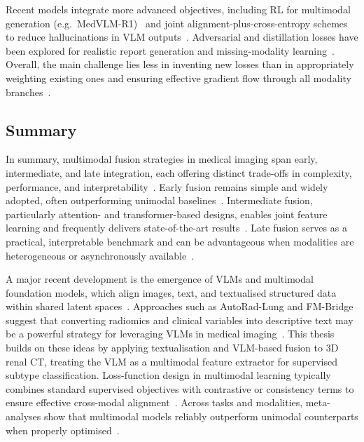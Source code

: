 Recent models integrate more advanced objectives, including RL for multimodal generation (e.g.\ MedVLM-R1)~\cite{pan2025medvlm} and joint alignment-plus-cross-entropy schemes to reduce hallucinations in VLM outputs~\cite{ryu2025vlmreview}. Adversarial and distillation losses have been explored for realistic report generation and missing-modality learning~\cite{fang2024aligning}. Overall, the main challenge lies less in inventing new losses than in appropriately weighting existing ones and ensuring effective gradient flow through all modality branches~\cite{mohsen2022artificial}.

\subsection{Summary} \label{sec:conclusion-lit}

In summary, multimodal fusion strategies in medical imaging span early, intermediate, and late integration, each offering distinct trade-offs in complexity, performance, and interpretability~\cite{mohsen2022artificial,kline2022multimodal}. Early fusion remains simple and widely adopted, often outperforming unimodal baselines~\cite{mohsen2022artificial,kline2022multimodal}. Intermediate fusion, particularly attention- and transformer-based designs, enables joint feature learning and frequently delivers state-of-the-art results~\cite{mohsen2022artificial,zhou2023transformer,simon2025multimodal}. Late fusion serves as a practical, interpretable benchmark and can be advantageous when modalities are heterogeneous or asynchronously available~\cite{mohsen2022artificial,huang2020multimodal,lu2024deep}.

A major recent development is the emergence of VLMs and multimodal foundation models, which align images, text, and textualised structured data within shared latent spaces~\cite{ryu2025vlmreview,radford2021learning,boecking2022biovil,huang2021gloria,park2020contrastive,zhang2023biomedclip}. Approaches such as AutoRad-Lung and FM-Bridge suggest that converting radiomics and clinical variables into descriptive text may be a powerful strategy for leveraging VLMs in medical imaging~\cite{khademi2025autorad,huang2025fmbridge}. This thesis builds on these ideas by applying textualisation and VLM-based fusion to 3D renal CT, treating the VLM as a multimodal feature extractor for supervised subtype classification. Loss-function design in multimodal learning typically combines standard supervised objectives with contrastive or consistency terms to ensure effective cross-modal alignment~\cite{windsor2023vision,huang2021gloria,haq2025mmml}. Across tasks and modalities, meta-analyses show that multimodal models reliably outperform unimodal counterparts when properly optimised~\cite{kline2022multimodal,haq2025mmml,simon2025multimodal,huang2020fusion,mohsen2022artificial}.

